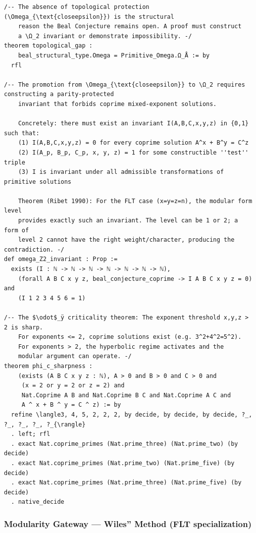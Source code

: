 \documentclass[12pt,a4paper]{article}
\begin{document}
\begin{lstlisting}[language=lean4]
/-- The absence of topological protection (\Omega_{\text{closeepsilon}}) is the structural
    reason the Beal Conjecture remains open. A proof must construct
    a \Ω_2 invariant or demonstrate impossibility. -/
theorem topological_gap :
    beal_structural_type.Omega = Primitive_Omega.Ω_Å := by
  rfl

/-- The promotion from \Omega_{\text{closeepsilon}} to \Ω_2 requires constructing a parity-protected
    invariant that forbids coprime mixed-exponent solutions.
    
    Concretely: there must exist an invariant I(A,B,C,x,y,z) in {0,1} such that:
    (1) I(A,B,C,x,y,z) = 0 for every coprime solution A^x + B^y = C^z
    (2) I(A_p, B_p, C_p, x, y, z) = 1 for some constructible ''test'' triple
    (3) I is invariant under all admissible transformations of primitive solutions
    
    Theorem (Ribet 1990): For the FLT case (x=y=z=n), the modular form level
    provides exactly such an invariant. The level can be 1 or 2; a form of
    level 2 cannot have the right weight/character, producing the contradiction. -/
def omega_Z2_invariant : Prop :=
  exists (I : ℕ -> ℕ -> ℕ -> ℕ -> ℕ -> ℕ -> ℕ),
    (forall A B C x y z, beal_conjecture_coprime -> I A B C x y z = 0) and
    (I 1 2 3 4 5 6 = 1)

/-- The $\odot$_ÿ criticality theorem: The exponent threshold x,y,z > 2 is sharp.
    For exponents <= 2, coprime solutions exist (e.g. 3^2+4^2=5^2).
    For exponents > 2, the hyperbolic regime activates and the
    modular argument can operate. -/
theorem phi_c_sharpness : 
    (exists (A B C x y z : ℕ), A > 0 and B > 0 and C > 0 and 
     (x = 2 or y = 2 or z = 2) and
     Nat.Coprime A B and Nat.Coprime B C and Nat.Coprime A C and
     A ^ x + B ^ y = C ^ z) := by
  refine \langle3, 4, 5, 2, 2, 2, by decide, by decide, by decide, ?_, ?_, ?_, ?_, ?_{\rangle}
  . left; rfl
  . exact Nat.coprime_primes (Nat.prime_three) (Nat.prime_two) (by decide)
  . exact Nat.coprime_primes (Nat.prime_two) (Nat.prime_five) (by decide)
  . exact Nat.coprime_primes (Nat.prime_three) (Nat.prime_five) (by decide)
  . native_decide
\end{lstlisting}

\subsubsection{Modularity Gateway --- Wiles'' Method (FLT specialization)}
\end{document}
